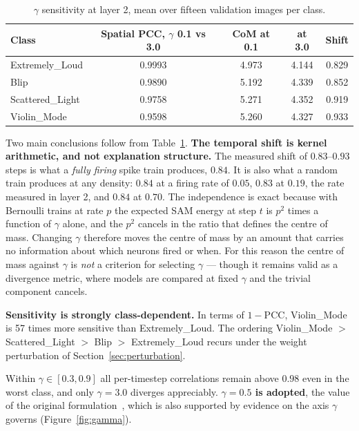 \begin{table}[htbp]
\centering
\begin{tabular}{lcccc}
\toprule
Class & Spatial PCC, $\gamma$ 0.1 vs 3.0 & CoM at 0.1 & at 3.0 & Shift \\
\midrule
Extremely\_Loud & 0.9993 & 4.973 & 4.144 & 0.829 \\
Blip & 0.9890 & 5.192 & 4.339 & 0.852 \\
Scattered\_Light & 0.9758 & 5.271 & 4.352 & 0.919 \\
Violin\_Mode & 0.9598 & 5.260 & 4.327 & 0.933 \\
\bottomrule
\end{tabular}
\caption{$\gamma$ sensitivity at layer 2, mean over fifteen validation images per
class.}
\label{tab:gamma}
\end{table}

Two main conclusions follow from Table~\ref{tab:gamma}. 
\textbf{The temporal shift is kernel arithmetic, and not explanation structure.} The
measured shift of $0.83$--$0.93$ steps is what a \emph{fully firing} spike train
produces, $0.84$. It is also what a random train produces at any density: $0.84$
at a firing rate of $0.05$, $0.83$ at $0.19$, the rate measured in layer 2, and
$0.84$ at $0.70$. The independence is exact because with
Bernoulli trains at rate $p$ the expected SAM energy at step $t$ is
$p^{2}$ times a function of $\gamma$ alone, and the $p^{2}$ cancels in the ratio
that defines the centre of mass. Changing $\gamma$ therefore moves the centre of
mass by an amount that carries no information about which neurons fired or when.
For this reason the centre of mass against $\gamma$ is \emph{not} a criterion for
selecting $\gamma$ --- though it remains valid as a divergence metric, where
models are compared at fixed $\gamma$ and the trivial component cancels.

\textbf{Sensitivity is strongly class-dependent.} In terms of $1 - \mathrm{PCC}$,
Violin\_Mode is 57 times more sensitive than Extremely\_Loud. The ordering
Violin\_Mode $>$ Scattered\_Light $>$ Blip $>$ Extremely\_Loud recurs under the
weight perturbation of Section~\ref{sec:perturbation}.

Within $\gamma \in [0.3, 0.9]$ all per-timestep correlations remain above $0.98$
even in the worst class, and only $\gamma = 3.0$ diverges appreciably.
\textbf{$\gamma = 0.5$ is adopted}, the value of the original
formulation~\cite{kim2021sam}, which is also supported by evidence on the axis $\gamma$
 governs (Figure~\ref{fig:gamma}).


